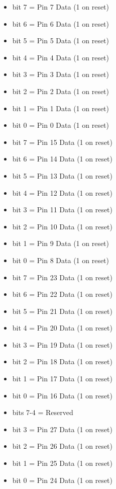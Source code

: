 \begin{itemize}
\item bit 7 = Pin 7 Data (1 on reset)
\item bit 6 = Pin 6 Data (1 on reset)
\item bit 5 = Pin 5 Data (1 on reset)
\item bit 4 = Pin 4 Data (1 on reset)
\item bit 3 = Pin 3 Data (1 on reset)
\item bit 2 = Pin 2 Data (1 on reset)
\item bit 1 = Pin 1 Data (1 on reset)
\item bit 0 = Pin 0 Data (1 on reset)
\end{itemize}

\begin{itemize}
\item bit 7 = Pin 15 Data (1 on reset)
\item bit 6 = Pin 14 Data (1 on reset)
\item bit 5 = Pin 13 Data (1 on reset)
\item bit 4 = Pin 12 Data (1 on reset)
\item bit 3 = Pin 11 Data (1 on reset)
\item bit 2 = Pin 10 Data (1 on reset)
\item bit 1 = Pin 9 Data (1 on reset)
\item bit 0 = Pin 8 Data (1 on reset)
\end{itemize}

\begin{itemize}
\item bit 7 = Pin 23 Data (1 on reset)
\item bit 6 = Pin 22 Data (1 on reset)
\item bit 5 = Pin 21 Data (1 on reset)
\item bit 4 = Pin 20 Data (1 on reset)
\item bit 3 = Pin 19 Data (1 on reset)
\item bit 2 = Pin 18 Data (1 on reset)
\item bit 1 = Pin 17 Data (1 on reset)
\item bit 0 = Pin 16 Data (1 on reset)
\end{itemize}

\begin{itemize}
\item bits 7-4 = Reserved
\item bit 3 = Pin 27 Data (1 on reset)
\item bit 2 = Pin 26 Data (1 on reset)
\item bit 1 = Pin 25 Data (1 on reset)
\item bit 0 = Pin 24 Data (1 on reset)
\end{itemize}

